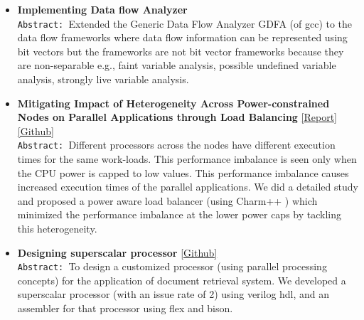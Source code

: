 \documentclass[9pt]{article}
\newenvironment{changemargin}[2]{%
  \begin{list}{}{%
    \setlength{\topsep}{0pt}%
    \setlength{\leftmargin}{#1}%
    \setlength{\rightmargin}{#2}%
    \setlength{\listparindent}{\parindent}%
    \setlength{\itemindent}{\parindent}%
    \setlength{\parsep}{\parskip}%
  }%
  \item[]}{\end{list}
}
\newenvironment{body} {
	\vspace*{-16pt}
	\begin{changemargin}{-0.25in}{-0.5in}
  }	
	{\end{changemargin}
}
\begin{document}
\begin{body}
\begin{itemize}
            \item \textbf{Implementing Data flow Analyzer} \\
                                \texttt{Abstract: }Extended the Generic Data Flow Analyzer
                                GDFA (of gcc) to the data flow frameworks where
                                data flow information can be represented using
                                bit vectors but the frameworks are not bit
                                vector frameworks because they are
                                non-separable e.g., faint variable analysis,
                                possible undefined variable analysis, strongly
                                live variable analysis.	
          \item \textbf{Mitigating Impact of Heterogeneity Across Power-constrained Nodes on Parallel Applications through Load Balancing}     
                                \href{http://web.engr.illinois.edu/~sdasgup3/Document/report_cs533.pdf}{[Report]}
                                \href{https://github.com/sdasgup3/HeterogeneityAwareLoadBalancing}{[Github]} \\
                                  \texttt{Abstract: }Different processors across the nodes
                                  have different execution times for the same
                                  work-loads. This performance imbalance is seen
                                  only when the CPU power is capped to low
                                  values. This performance imbalance causes
                                  increased execution times of the parallel
                                  applications. We did a detailed study and
                                  proposed a power aware load balancer (using
                                      Charm++ ) which minimized the performance
                                  imbalance at the lower power caps by tackling
                                  this heterogeneity.  
           \item \textbf{Designing superscalar processor} \href{https://github.com/sdasgup3/Parallel-Processor-Design}{[Github]} \\
                                \texttt{Abstract: }To design a customized processor (using
                                    parallel processing concepts) for the
                                application of document retrieval system. We
                                developed a superscalar processor (with  an
                                    issue rate of 2) using verilog hdl, and an
                                assembler for that processor using flex and
                                bison.  


\end{itemize}
\end{body}
\end{document}
